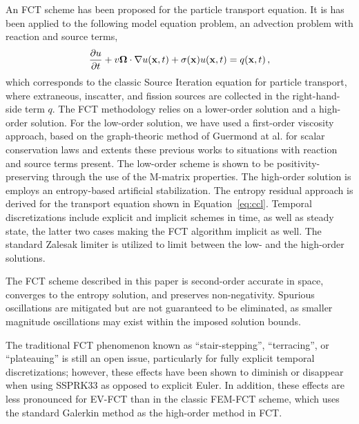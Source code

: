 An FCT scheme has been proposed for the particle transport equation. It is has been applied
to the following model equation problem, an advection problem with reaction and source terms,
\begin{equation} \label{eq:ccl}
  \frac{\partial u}{\partial t} + v\mathbf{\Omega}\cdot\nabla u(\mathbf{x},t) + \sigma(\mathbf{x}) u(\mathbf{x},t) = q(\mathbf{x},t) \,,
\end{equation}
which corresponds to the classic Source Iteration equation for particle transport,
where extraneous, inscatter, and fission sources are collected in the right-hand-side term $q$.
%
The FCT methodology relies on a lower-order solution and a high-order solution. For the low-order
solution, we have used a first-order viscosity approach, based on the graph-theoric method of
Guermond at al. \cite{guermond_firstorder} for scalar conservation laws and extents these
previous works to situations with reaction and source terms present. The low-order scheme is shown
to be positivity-preserving through the use of the M-matrix properties. The high-order solution
is employs an entropy-based artificial stabilization. The entropy residual approach is derived
for the transport equation shown in Equation~\eqref{eq:ccl}.
Temporal discretizations include explicit and implicit schemes in time, as well as steady state,
the latter two cases making the FCT algorithm implicit as well. The standard Zalesak limiter is utilized
to limit between the low- and the high-order solutions.

The FCT scheme described in this paper is second-order accurate in space,
converges to the entropy solution, and preserves non-negativity.
Spurious oscillations are mitigated but are not guaranteed to be
eliminated, as smaller magnitude oscillations may exist within the imposed
solution bounds.


The traditional FCT phenomenon known as ``stair-stepping'',
``terracing'', or ``plateauing'' is still an open issue, particularly for
fully explicit temporal discretizations; however, these effects
have been shown to diminish or disappear when using SSPRK33 as opposed
to explicit Euler. In addition, these effects are less pronounced for EV-FCT
than in the classic FEM-FCT scheme, which uses the standard Galerkin method as
the high-order method in FCT.


